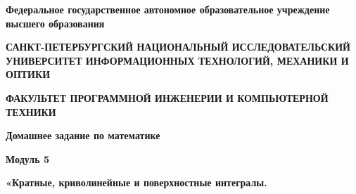 \documentclass[12pt]{article}
\begin{document}
	\pagestyle{empty}
	
	\begin{center}
		\normalsize
		\textbf{Федеральное государственное автономное образовательное учреждение высшего образования}

		\small
		\medskip 
		\textbf{САНКТ-ПЕТЕРБУРГСКИЙ НАЦИОНАЛЬНЫЙ ИССЛЕДОВАТЕЛЬСКИЙ  УНИВЕРСИТЕТ ИНФОРМАЦИОННЫХ ТЕХНОЛОГИЙ, МЕХАНИКИ И ОПТИКИ}

		\medskip 
		\textbf{ФАКУЛЬТЕТ ПРОГРАММНОЙ ИНЖЕНЕРИИ И КОМПЬЮТЕРНОЙ ТЕХНИКИ}	
	\bigskip\bigskip\bigskip\bigskip\bigskip\bigskip\bigskip\bigskip\bigskip\bigskip\bigskip\bigskip	
		\par\medskip\par\smallskip\par\smallskip
		\Large 
		\textbf{Домашнее задание по математике} 

		\textbf{Модуль 5}

		\large
		\par\bigskip
		\textbf{«Кратные, криволинейные и поверхностные интегралы.}
		

\end{center}
\end{document}

